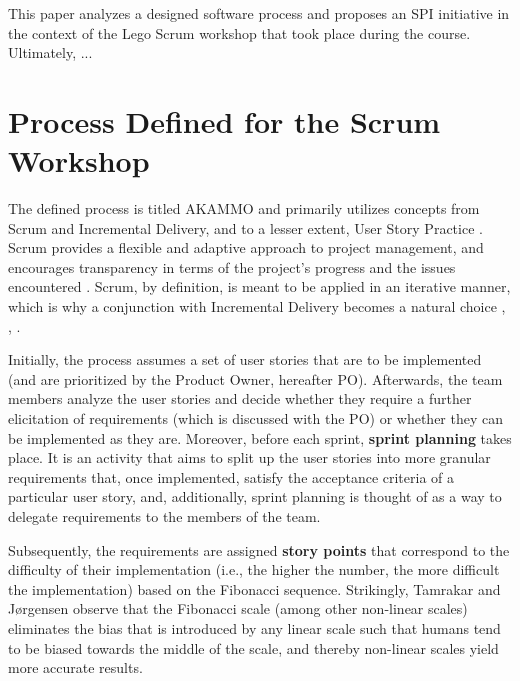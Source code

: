 \documentclass[conference]{IEEEtran}
\begin{document}
This paper analyzes a designed software process and proposes an SPI initiative 
in the context of the Lego Scrum workshop that took place during the course.
Ultimately, ... %

\section{Process Defined for the Scrum Workshop}
\label{sec:process}


The defined process is titled {\selectfont AKAMMO} and primarily
utilizes concepts from Scrum and Incremental Delivery, and to a lesser extent,
User Story Practice \cite{DIT348A1}. Scrum provides a flexible and adaptive
approach to project management, and encourages transparency in terms of the
project's progress and the issues encountered \cite{Schwaber2020}. Scrum, by
definition, is meant to be applied in an iterative manner, which is why a
conjunction with Incremental Delivery becomes a natural choice
\cite{Schwaber2020}, \cite{Srivastava2017}, \cite{Schwaber1997}.

Initially, the process assumes a set of user stories that are to be implemented
(and are prioritized by the Product Owner, hereafter PO). Afterwards, the team
members analyze the user stories and decide whether they require a further
elicitation of requirements (which is discussed with the PO) or whether they
can be implemented as they are.
Moreover, before each sprint, \textbf{sprint planning} takes place. It is an
activity that aims to split up the user stories into more granular requirements
that, once implemented, satisfy the acceptance criteria of a particular user
story, and, additionally, sprint planning is thought of as a way to delegate
requirements to the members of the team.

Subsequently, the requirements are assigned \textbf{story points} that
correspond to the difficulty of their implementation (i.e., the higher
the number, the more difficult the implementation) based on the Fibonacci
sequence. Strikingly, Tamrakar and J\o{}rgensen \cite{Tamrakar2012} observe
that the Fibonacci scale (among other non-linear scales) eliminates the bias
that is introduced by any linear scale such that humans tend to be biased
towards the middle of the scale, and thereby non-linear scales yield more
accurate results.
\end{document}
